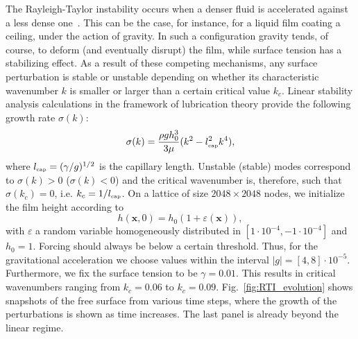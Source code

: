The Rayleigh-Taylor instability occurs when a denser fluid is accelerated 
against a less dense one~\cite{Rayleigh,Taylor,KULL1991197,Sharp}. This can be the case, for instance, 
for a liquid film coating a ceiling, under the action of gravity. In such a configuration
gravity tends, of course, to deform (and eventually disrupt) the film, while surface tension has a stabilizing effect.
As a result of these competing mechanisms, any surface perturbation is stable or unstable
depending on whether its characteristic wavenumber $k$ is smaller or larger than a certain
critical value $k_c$. Linear stability analysis calculations in the framework of lubrication theory provide the following growth rate $\sigma(k)$:
\begin{equation}\label{eq:RTgrowth}
    \sigma(k) = \frac{\rho g h_0^3}{3\mu}(k^2 - l_{\mbox{\tiny{cap}}}^2 k^4),
\end{equation}
where $l_{\mbox{\tiny{cap}}} = (\gamma/g)^{1/2}$ is the capillary length. 
Unstable (stable) modes correspond to
$\sigma(k)>0$ ($\sigma(k)<0$) and the critical wavenumber is, therefore, such that $\sigma(k_c)=0$, i.e. 
$k_c = 1/l_{\mbox{\tiny{cap}}}$.
On a lattice of size $2048 \times 2048$ nodes, we initialize the film height according to
\begin{equation}
 h(\mathbf{x},0) = h_0(1 + \varepsilon(\mathbf{x})),
\end{equation}
with $\varepsilon$ a random variable homogeneously distributed in $[1\cdot 10^{-4},-1\cdot 10^{-4}]$ and $h_0 = 1$. Forcing should always be below a certain threshold. Thus, for the gravitational acceleration we choose values within the interval $|g| = [4,8]\cdot 10^{-5}$. Furthermore, we fix the surface tension to be $\gamma=0.01$. This results in critical wavenumbers ranging from $k_c= 0.06$ to $k_c = 0.09$.
Fig.~\ref{fig:RTI_evolution} shows snapshots of the free surface from various time steps, where the growth of the perturbations is shown as time increases. The last panel is already beyond the linear regime.

